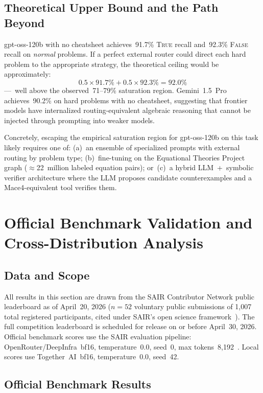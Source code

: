 \documentclass[11pt]{article}
\begin{document}
\subsection{Theoretical Upper Bound and the Path Beyond}

gpt-oss-120b with no cheatsheet achieves~91.7\% \textsc{True} recall
and~92.3\% \textsc{False} recall on \emph{normal} problems. If a
perfect external router could direct each hard problem to the
appropriate strategy, the theoretical ceiling would be approximately:
\[
  0.5 \times 91.7\% + 0.5 \times 92.3\% = 92.0\%
\]
---~well above the observed~71--79\% saturation region. Gemini~1.5~Pro
achieves~90.2\% on hard problems with no cheatsheet, suggesting that
frontier models have internalized routing-equivalent algebraic reasoning
that cannot be injected through prompting into weaker models.

Concretely, escaping the empirical saturation region for gpt-oss-120b
on this task likely requires one of:
(a)~an ensemble of specialized prompts with external routing by problem
type; (b)~fine-tuning on the Equational Theories Project graph
($\approx$22~million labeled equation pairs); or~(c)~a hybrid
LLM~+~symbolic verifier architecture where the LLM proposes candidate
counterexamples and a Mace4-equivalent tool verifies them.

\section{Official Benchmark Validation and Cross-Distribution Analysis}
\label{sec:official}

\subsection{Data and Scope}

All results in this section are drawn from the SAIR Contributor
Network public leaderboard as of April~20, 2026 ($n = 52$ voluntary
public submissions of 1{,}007 total registered participants,
cited under SAIR's open science framework~\citep{sair2026leaderboard}).
The full competition leaderboard is scheduled for release on or
before April~30, 2026. Official benchmark scores use the SAIR
evaluation pipeline: OpenRouter/DeepInfra~bf16, temperature~0.0,
seed~0, max tokens~8{,}192~\citep{sair2026judge}. Local scores
use Together~AI~bf16, temperature~0.0, seed~42.

\subsection{Official Benchmark Results}
\end{document}
